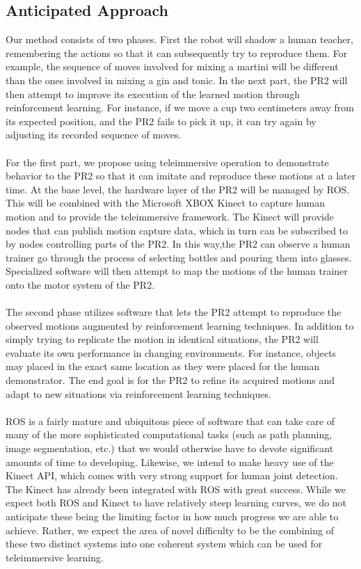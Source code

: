 \documentclass{sig-alternate}
\begin{document}
\subsection{Anticipated Approach}
\label{subsec:approach}
Our method consists of two phases. First the robot will shadow a human teacher,
remembering the actions so that it can subsequently try to reproduce them. For example,
the sequence of moves involved for mixing a martini will be different than the ones
involved in mixing a gin and tonic.
In the next part, the PR2 will then attempt to improve its execution of the learned motion through 
reinforcement learning. For instance, if we move a cup two centimeters away
from its expected position, and the PR2 fails to pick it up, it can try again 
by adjusting its recorded sequence of moves. 
\\
\\For the first part, we propose using teleimmersive operation to demonstrate
behavior to the PR2 so that it can imitate and reproduce these motions at a
later time. At the base level, the hardware layer of the PR2 will be managed 
by ROS. This will be combined with the Microsoft XBOX Kinect to capture human
motion and to provide the teleimmersive framework. The Kinect will provide nodes
that can publish motion capture data, which in turn can be subscribed to by nodes
controlling parts of the PR2.
In this way,the PR2 can observe a human trainer go
through the process of selecting bottles and pouring them into glasses. 
Specialized software will then attempt to map the motions of the human trainer
onto the motor system of the PR2.
\\
\\The second phase utilizes software that lets the PR2 attempt to reproduce
the observed motions augmented by reinforcement learning techniques. In addition
to simply trying to replicate the motion in identical situations,
the PR2 will evaluate its own performance in changing environments. For instance, 
objects may
placed in the exact same location as they were placed for the human demonstrator.
The end goal is for the PR2 to refine its acquired motions and adapt to new
situations via reinforcement learning techniques. 
\\ 
\\ROS is a fairly mature and ubiquitous piece of software that can take care of
many of the more sophisticated computational tasks (such as path planning, 
image segmentation, etc.) that we would otherwise have to devote significant 
amounts of time to developing.  
Likewise, we intend to make heavy use of the Kinect API, which comes with very
strong support for human joint detection. The Kinect has already been integrated with 
ROS with great success.
While we expect both ROS and Kinect to have relatively steep learning curves,
we do not anticipate these being the limiting factor in how much progress we
are able to achieve. 
Rather, we expect the area of novel difficulty to be the combining of these
two distinct systems into one coherent system which can be used for
teleimmersive learning.
\end{document}
